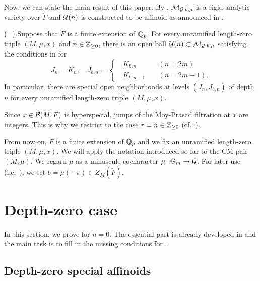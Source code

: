 \documentclass[12pt,reqno]{amsart}
\begin{document}
Now, we can state the main result of this paper. By , ${\mathcal{M}}_{{\mathcal{G}}, b, \mu}$ is a rigid analytic variety over $\breve{F}$ and ${\mathcal{U}}(n)$ is constructed to be affinoid as announced in . 

\begin{thm}\textup{(=)} \label{thm:explicit_geometry}
    Suppose that $F$ is a finite extension of $\mathbb{Q}_p$. For every unramified length-zero triple $(M, \mu, x)$ and $n \in \mathbb{Z}_{\geq 0}$, there is an open ball 
    $
        {\mathcal{U}}(n) \subset {\mathcal{M}}_{{\mathcal{G}}, b, \mu}
    $
    satisfying the conditions in  for
    \[
        J_n = K_n, \quad 
        J_{b, n} = \left\{ \begin{alignedat}{4}
            & K_{b, n} & \; & (n = 2m) \\
            & K_{b, n - 1} & \; & (n = 2m - 1). 
        \end{alignedat}
        \right.
    \]
    In particular, there are special open neighborhoods at levels $(J_n, J_{b, n})$ of depth $n$ for every unramified length-zero triple $(M, \mu, x)$. 
\end{thm}

\begin{rmk}
    Since $x \in {\mathcal{B}}(M, F)$ is hyperspecial, jumps of the Moy-Prasad filtration at $x$ are integers. This is why we restrict to the case $r = n \in \mathbb{Z}_{\geq 0}$ (cf.\ ). 
\end{rmk}

From now on, $F$ is a finite extension of $\mathbb{Q}_p$ and we fix an unramified length-zero triple $(M, \mu, x)$. We will apply the notation introduced so far to the CM pair $(M, \mu)$. We regard $\mu$ as a minuscule cocharacter $\mu \colon \mathbb{G}_m \to \breve{{\mathcal{G}}}$. For later use (i.e.\ ), we set $b = \mu(-\pi) \in Z_M(\breve{F})$. 

\section{Depth-zero case} \label{sec:depth_zero_case}

In this section, we prove  for $n = 0$. The essential part is already developed in \cite{Tak25z} and the main task is to fill in the missing conditions for . 

\subsection{Depth-zero special affinoids}
\end{document}
